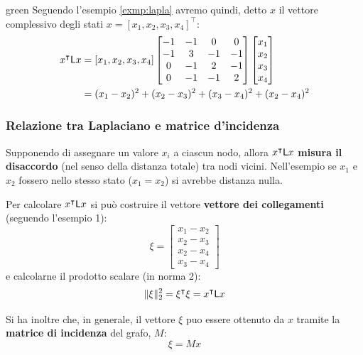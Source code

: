 \begin{mybox}{green}{}
Seguendo l'esempio \ref{exmp:lapla} avremo quindi, detto $x$ il vettore complessivo degli stati $x = [x_1, x_2, x_3, x_4]^\intercal$:
\begin{align*}
x^\intercal \mathsf{L} x &= [x_1, x_2, x_3, x_4] \begin{bmatrix}
-1 & -1 & 0 & 0 \\
-1 & 3 & -1 & -1 \\
0 & -1 & 2 & -1 \\
0 & -1 & -1 & 2 \\
\end{bmatrix} \begin{bmatrix} x_1 \\ x_2 \\ x_3 \\ x_4 \end{bmatrix} \\
&= (x_1 - x_2)^2 + (x_2 - x_3)^2 + (x_3 - x_4)^2 + (x_2 - x_4)^2
\end{align*}
\end{mybox}

\subsubsection{Relazione tra Laplaciano e matrice d'incidenza}
\label{sec:lapinc}

Supponendo di assegnare un valore $x_i$ a ciascun nodo, allora $x^\intercal \mathsf{L} x$ \textbf{misura il disaccordo} (nel senso della distanza totale) tra nodi vicini. 
Nell'esempio se $x_1$ e $x_2$ fossero nello stesso stato ($x_1 = x_2$) si avrebbe distanza nulla.

Per calcolare $x^\intercal \mathsf{L} x$ si pu\`o costruire il vettore \textbf{vettore dei collegamenti} (seguendo l'esempio 1):
\begin{equation}
 \xi = 
\begin{bmatrix}
x_1 - x_2 \\
x_2 - x_3 \\
x_2 - x_4 \\
x_3 - x_4 
\end{bmatrix}
\end{equation}
e calcolarne il prodotto scalare (in norma 2):
\begin{equation}
    \| \xi \|^2_2 = \xi^\intercal \xi = x^\intercal \mathsf{L} x
\end{equation}

Si ha inoltre che, in generale, il vettore $\xi$ puo essere ottenuto da $x$ tramite la \textbf{matrice di incidenza} del grafo, $M$:
\begin{equation}
\xi = M x
\end{equation}


